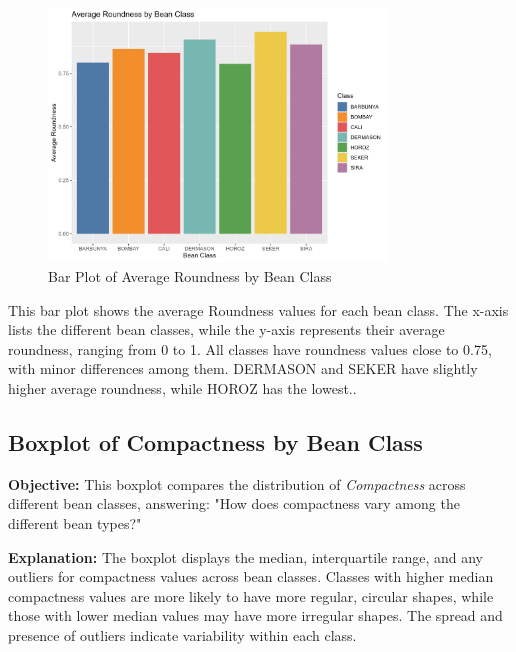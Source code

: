 \documentclass[a4paper,12pt]{article}
\begin{document}
\begin{figure}[H]
    \centering
    \includegraphics[width=0.8\textwidth]{graphs/barplot_roundness.png}
    \caption{Bar Plot of Average Roundness by Bean Class}
    \label{fig:barplot_roundness}
\end{figure}
This bar plot shows the average Roundness values for each bean class. The x-axis lists the different bean classes, while the y-axis represents their average roundness, ranging from 0 to 1. All classes have roundness values close to 0.75, with minor differences among them. DERMASON and SEKER have slightly higher average roundness, while HOROZ has the lowest..

\newpage

\subsection{Boxplot of Compactness by Bean Class}
\noindent\textbf{Objective:} This boxplot compares the distribution of \textit{Compactness} across different bean classes, answering: "How does compactness vary among the different bean types?"

\noindent\textbf{Explanation:} The boxplot displays the median, interquartile range, and any outliers for compactness values across bean classes. Classes with higher median compactness values are more likely to have more regular, circular shapes, while those with lower median values may have more irregular shapes. The spread and presence of outliers indicate variability within each class.
\end{document}
